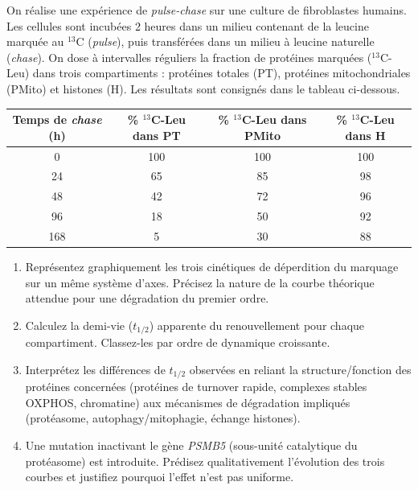 \documentclass[11pt]{article}
\begin{document}
\begin{exercice}
On réalise une expérience de \textit{pulse-chase} sur une culture de fibroblastes humains. Les cellules sont incubées 2 heures dans un milieu contenant de la leucine marquée au $^{13}$C (\textit{pulse}), puis transférées dans un milieu à leucine naturelle (\textit{chase}). On dose à intervalles réguliers la fraction de protéines marquées ($^{13}$C-Leu) dans trois compartiments : protéines totales (PT), protéines mitochondriales (PMito) et histones (H). Les résultats sont consignés dans le tableau ci-dessous.

\begin{center}
\begin{tabular}{|c|c|c|c|}
\hline
Temps de \textit{chase} (h) & \% $^{13}$C-Leu dans PT & \% $^{13}$C-Leu dans PMito & \% $^{13}$C-Leu dans H \\
\hline
0 & 100 & 100 & 100 \\
24 & 65 & 85 & 98 \\
48 & 42 & 72 & 96 \\
96 & 18 & 50 & 92 \\
168 & 5 & 30 & 88 \\
\hline
\end{tabular}
\end{center}

\begin{enumerate}
\item Représentez graphiquement les trois cinétiques de déperdition du marquage sur un même système d'axes. Précisez la nature de la courbe théorique attendue pour une dégradation du premier ordre.
\item Calculez la demi-vie ($t_{1/2}$) apparente du renouvellement pour chaque compartiment. Classez-les par ordre de dynamique croissante.
\item Interprétez les différences de $t_{1/2}$ observées en reliant la structure/fonction des protéines concernées (protéines de turnover rapide, complexes stables OXPHOS, chromatine) aux mécanismes de dégradation impliqués (protéasome, autophagy/mitophagie, échange histones).
\item Une mutation inactivant le gène \textit{PSMB5} (sous-unité catalytique du protéasome) est introduite. Prédisez qualitativement l'évolution des trois courbes et justifiez pourquoi l'effet n'est pas uniforme.
\end{enumerate}
\end{exercice}
\end{document}
